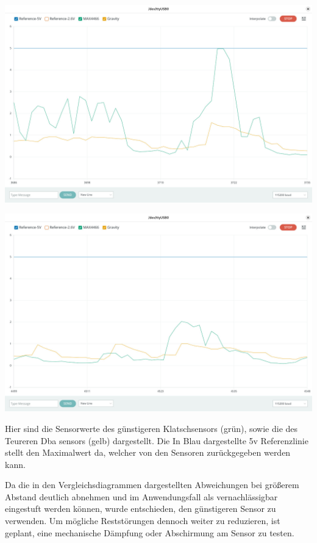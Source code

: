 \begin{center}
  \includegraphics[width=1\textwidth]{../images/PeekSensorVergleich.jpeg}
\end{center}
\begin{center}
  \includegraphics[width=1\textwidth]{../images/StaticSensorVergleich.jpeg}
\end{center}

Hier sind die Sensorwerte des günstigeren Klatschsensors (grün), sowie die des Teureren Dba sensors (gelb) dargestellt. Die In Blau dargestellte 5v Referenzlinie stellt den Maximalwert da, welcher von den Sensoren zurückgegeben werden kann.

Da die in den Vergleichsdiagrammen dargestellten Abweichungen bei größerem Abstand deutlich abnehmen und im Anwendungsfall als vernachlässigbar eingestuft werden können, wurde entschieden, den günstigeren Sensor zu verwenden. 
Um mögliche Reststörungen dennoch weiter zu reduzieren, ist geplant, eine mechanische Dämpfung oder Abschirmung am Sensor zu testen.

